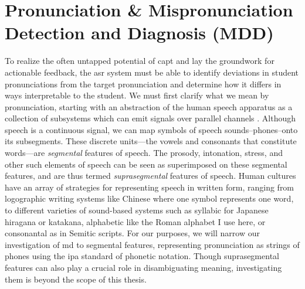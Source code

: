 \documentclass[thesis]{cluu}
\begin{document}
\section{Pronunciation \& Mispronunciation Detection and Diagnosis (MDD)}
To realize the often untapped potential of \gls{capt} and lay the groundwork for actionable feedback, the \gls{asr} system must be able to identify deviations in student pronunciations from the target pronunciation and determine how it differs in ways interpretable to the student. We must first clarify what we mean by pronunciation, starting with an abstraction of the human speech apparatus as a collection of subsystems which can emit signals over parallel channels \parencite{engstrandFonetikensGrunder2004}. Although speech is a continuous signal, we can map symbols of speech sounds--phones--onto its subsegments. These discrete units---the vowels and consonants that constitute words---are \textit{segmental} features of speech. The prosody, intonation, stress, and other such elements of speech can be seen as superimposed on these segmental features, and are thus termed \textit{suprasegmental} features of speech\parencite{engstrandFonetikensGrunder2004}. Human cultures have an array of strategies for representing speech in written form, ranging from logographic writing systems like Chinese where one symbol represents one word, to different varieties of sound-based systems such as syllabic for Japanese hiragana or katakana, alphabetic like the Roman alphabet I use here, or consonantal as in Semitic scripts\parencite{jurafskySpeechLanguageProcessing2025}. For our purposes, we will narrow our investigation of \gls{md} to segmental features, representing pronunciation as strings of phones using the \gls{ipa} standard of phonetic notation. Though suprasegmental features can also play a crucial role in disambiguating meaning, investigating them is beyond the scope of this thesis.
\end{document}
